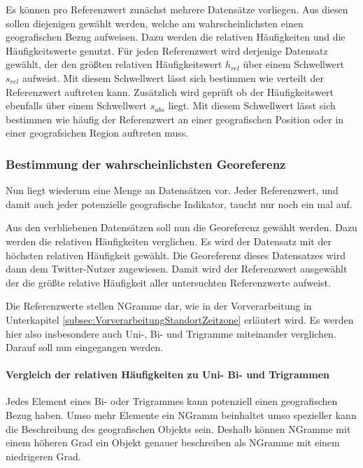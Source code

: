 				Es können pro Referenzwert zunächst mehrere Datensätze vorliegen.
				Aus diesen sollen diejenigen gewählt werden, welche am wahrscheinlichsten einen geografischen Bezug aufweisen.
				Dazu werden die relativen Häufigkeiten und die Häufigkeitswerte genutzt. 
				Für jeden Referenzwert wird derjenige Datensatz gewählt, der den größten relativen Häufigkeitswert $h_{rel}$ über einem Schwellwert $s_{rel}$ aufweist.
				Mit diesem Schwellwert lässt sich bestimmen wie verteilt der Referenzwert auftreten kann.
				Zusätzlich wird geprüft ob der Häufigkeitswert ebenfalls über einem Schwellwert $s_{abs}$ liegt.
				Mit diesem Schwellwert lässt sich bestimmen wie häufig der Referenzwert an einer geografischen Position oder in einer geografsichen Region auftreten muss. 
				

			\subsubsection{Bestimmung der wahrscheinlichsten Georeferenz} 

				Nun liegt wiederum eine Menge an Datensätzen vor.
				Jeder Referenzwert, und damit auch jeder potenzielle geografische Indikator, taucht nur noch ein mal auf. 

				Aus den verbliebenen Datensätzen soll nun die Georeferenz gewählt werden. 
				Dazu werden die relativen Häufigkeiten verglichen.
				Es wird der Datensatz mit der höchsten relativen Häufigkeit gewählt.
				Die Georeferenz dieses Datensatzes wird dann dem Twitter-Nutzer zugewiesen. 
				Damit wird der Referenzwert ausgewählt der die größte relative Häufigkeit aller untersuchten Referenzwerte aufweist. 

				Die Referenzwerte stellen NGramme dar, wie in der Vorverarbeitung in Unterkapitel \ref{subsec:VorverarbeitungStandortZeitzone} erläutert wird.
				Es werden hier also insbesondere auch Uni-, Bi- und Trigramme miteinander verglichen.
				Darauf soll nun eingegangen werden.

				\paragraph{Vergleich der relativen Häufigkeiten zu Uni- Bi- und Trigrammen}

					Jedes Element eines Bi- oder Trigrammes kann potenziell einen geografischen Bezug haben. 
					Umso mehr Elemente ein NGramm beinhaltet umso spezieller kann die Beschreibung des geografischen Objekts sein.
					Deshalb können NGramme mit einem höheren Grad ein Objekt genauer beschreiben als NGramme mit einem niedrigeren Grad.

